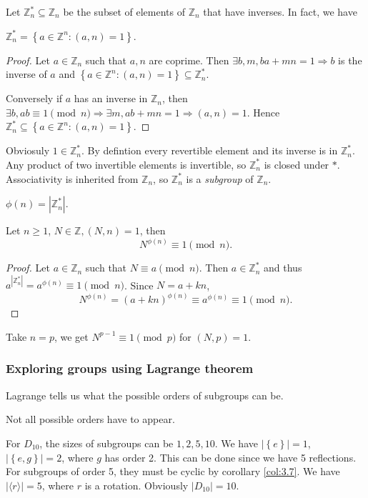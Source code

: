 \documentclass[a4paper]{article}
\begin{document}
    Let $ \mathbb{Z}_n^* \subseteq \mathbb{Z}_n $ be the subset of elements of $\mathbb{Z}_n$ that have inverses. In fact, we have 
    \begin{proposition}
        $ \mathbb{Z}_n^*=\left\{ a\in \mathbb{Z}^n: (a,n)=1\right\} $.
    \end{proposition}
    \begin{proof}
        Let $a\in \mathbb{Z}_n$ such that $a,n$ are coprime. Then $ \exists b,m, ba+mn=1 \Rightarrow b$ is the inverse of $a$ and $ \left\{ a\in \mathbb{Z}^n: (a,n)=1\right\} \subseteq \mathbb{Z}_n^* $.

        Conversely if $a$ has an inverse in $ \mathbb{Z}_n $, then $ \exists b, ab \equiv 1\pmod n \Rightarrow \exists m, ab+mn=1  \Rightarrow (a,n)=1$. Hence $\mathbb{Z}_n^* \subseteq \left\{ a\in \mathbb{Z}^n: (a,n)=1\right\}$. 
    \end{proof}
    Obviosuly $1\in \mathbb{Z}_n^*$. By defintion every revertible element and its inverse is in $\mathbb{Z}_n^*$. Any product of two invertible elements is invertible, so $\mathbb{Z}_n^*$ is closed under $*$. Associativity is inherited from $ \mathbb{Z}_n $, so $\mathbb{Z}_n^*$ is a \textit{subgroup} of $ \mathbb{Z}_n $.
    \begin{definition}
        $ \phi(n)=|\mathbb{Z}_n^*| $.
    \end{definition}
    \begin{theorem}\label{thm:fermat-euler}
        Let $n\ge 1$, $N\in \mathbb{Z}, (N,n)=1$, then
        \[
            N^{\phi(n)}\equiv 1\pmod n
        .\]
    \end{theorem}
    \begin{proof}
        Let $ a\in \mathbb{Z}_n $ such that $ N \equiv a \pmod{n} $. Then $a\in \mathbb{Z}_n^*$ and thus $ a^{|\mathbb{Z}_n^*|}=a^{\phi(n)} \equiv 1 \pmod{n} $. Since $ N=a+kn $,
        \[
            N^{\phi(n)}=(a+kn)^{\phi(n)} \equiv a^{\phi(n)}  \equiv 1 \pmod{n}.
        \]
    \end{proof}
    Take $n=p$, we get $ N^{p-1}\equiv 1\pmod{p} $ for $ (N,p)=1 $.
    \subsubsection{Exploring groups using Lagrange theorem}
    Lagrange tells us what the possible orders of subgroups can be.
    \begin{remark}
        Not all possible orders have to appear.
    \end{remark}
    \begin{example}
        For $D_{10}$, the sizes of subgroups can be $ 1,2,5,10 $. We have $ |\left\{ e\right\}|=1 $, $ |\left\{ e,g\right\}|=2 $, where $g$ has order 2. This can be done since we have 5 reflections. For subgroups of order 5, they must be cyclic by corollary \ref{col:3.7}. We have $ |\langle r \rangle |=5 $, where $r$ is a rotation. Obviously $ |D_{10}|=10 $.
    \end{example}
\end{document}
